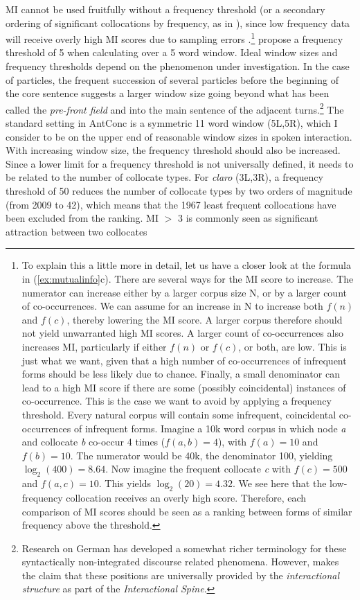 \ac{MI} cannot be used fruitfully without a frequency threshold (or a secondary ordering of significant collocations by frequency, as in \cite{Davies.20122019}), since low frequency data will receive overly high \ac{MI} scores due to sampling errors \citep{EvertKrenn.2001,EvertUhrigBartschProisl.2017}.\footnote{To explain this a little more in detail, let us have a closer look at the formula in (\ref{ex:mutualinfo}c). There are several ways for the \ac{MI} score to increase. The numerator can increase either by a larger corpus size N, or by a larger count of co-occurrences. We can assume for an increase in N to increase both $f(n)$ and $f(c)$, thereby lowering the \ac{MI} score. A larger corpus therefore should not yield unwarranted high \ac{MI} scores. A larger count of co-occurrences also increases \ac{MI}, particularly if either $f(n)$ or $f(c)$, or both, are low. This is just what we want, given that a high number of co-occurrences of infrequent forms should be less likely due to chance. Finally, a small denominator can lead to a high \ac{MI} score if there are some (possibly coincidental) instances of co-occurrence. This is the case we want to avoid by applying a frequency threshold. Every natural corpus will contain some infrequent, coincidental co-occurrences of infrequent forms. Imagine a 10k word corpus in which node \textit{a} and collocate \textit{b} co-occur 4 times ($f(a,b)=4$), with $f(a)=10$ and $f(b)=10$. The numerator would be 40k, the denominator 100, yielding $\log_2(400) = 8.64$. Now imagine the frequent collocate \textit{c} with $f(c) = 500$ and $f(a,c) = 10$. This yields $\log_2(20) = 4.32$. We see here that the low-frequency collocation receives an overly high score. Therefore, each comparison of \ac{MI} scores should be seen as a ranking between forms of similar frequency above the threshold.} \citet[24]{ChurchHanks.1990} propose a frequency threshold of 5 when calculating over a 5 word window. Ideal window sizes and frequency thresholds depend on the phenomenon under investigation. In the case of particles, the frequent succession of several particles before the beginning of the core sentence suggests a larger window size going beyond what has been called the \textit{pre-front field} \citep{Auer.1996,Schroeder.2006} and into the main sentence of the adjacent turns.\footnote{Research on German has developed a somewhat richer terminology for these syntactically non-integrated discourse related phenomena. However, \citet[72]{Wiltschko.2021} makes the claim that these positions are universally provided by the \textit{interactional structure} as part of the \textit{Interactional Spine}.} The standard setting in AntConc is a symmetric 11 word window (5L,5R), which I consider to be on the upper end of reasonable window sizes in spoken interaction. With increasing window size, the frequency threshold should also be increased. Since a lower limit for a frequency threshold is not universally defined, it needs to be related to the number of collocate types. For \textit{claro} (3L,3R), a frequency threshold of 50 reduces the number of collocate types by two orders of magnitude (from 2009 to 42), which means that the 1967 least frequent collocations have been excluded from the ranking. MI $>$ 3 is commonly seen as significant attraction between two collocates 